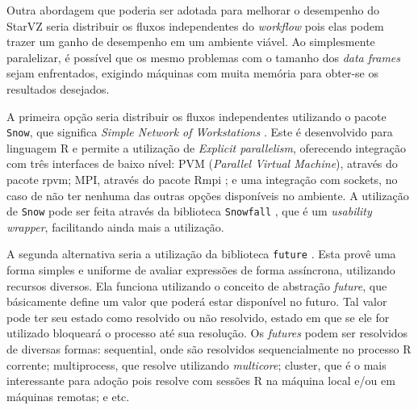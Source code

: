 Outra abordagem que poderia ser adotada para melhorar o desempenho do StarVZ seria distribuir os fluxos independentes
do \emph{workflow} pois elas podem trazer um ganho de desempenho em um ambiente viável.
Ao simplesmente paralelizar, é possível que os mesmo problemas com o tamanho dos \emph{data frames} sejam enfrentados, exigindo
máquinas com muita memória para obter-se os resultados desejados. 

A primeira opção seria distribuir os fluxos independentes utilizando o pacote \texttt{Snow}, que significa 
\emph{Simple Network of Workstations} \cite{ref:snow}. Este é desenvolvido para linguagem R e permite a utilização
de \emph{Explicit parallelism}, oferecendo integração com três interfaces de baixo nível: PVM (\emph{Parallel Virtual Machine}), através do pacote rpvm; MPI, através do pacote Rmpi \cite{ref:rmpi}; e uma integração com sockets, no caso de não ter nenhuma das outras 
opções disponíveis no ambiente. A utilização de \texttt{Snow} pode ser feita através da biblioteca \texttt{Snowfall} \cite{ref:snowfall},
que é um \emph{usability wrapper}, facilitando ainda mais a utilização.

A segunda alternativa seria a utilização da biblioteca \texttt{future} \cite{ref:future}. Esta provê uma forma simples e uniforme 
de avaliar expressões de forma assíncrona, utilizando recursos diversos. Ela funciona utilizando o conceito de abstração 
\emph{future}, que básicamente define um valor que poderá estar disponível no futuro. Tal valor pode ter seu estado como 
resolvido ou não resolvido, estado em que se ele for utilizado bloqueará o processo até sua resolução. Os \emph{futures} 
podem ser resolvidos de diversas formas: sequential, onde são resolvidos sequencialmente no processo R corrente; multiprocess,
que resolve utilizando \emph{multicore}; cluster, que é o mais interessante para adoção pois resolve com sessões R na máquina 
local e/ou em máquinas remotas; e etc.